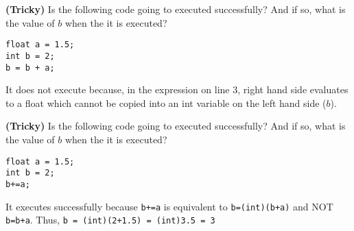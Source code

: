 \begin{questions}
\question \textbf{(Tricky)} Is the following code going to executed successfully? And if so, what is the value of $b$ when the it is executed?

\begin{lstlisting}
float a = 1.5;
int b = 2;
b = b + a;
\end{lstlisting}

\begin{solution}
It does not execute because, in the expression on line 3, right hand side evaluates to a float which cannot be copied into an int variable on the left hand side ($b$).
\end{solution}


\question \textbf{(Tricky)} Is the following code going to executed successfully? And if so, what is the value of $b$ when the it is executed?

\begin{lstlisting}
float a = 1.5;
int b = 2;
b+=a;
\end{lstlisting}

\begin{solution}
It executes successfully because \texttt{b+=a} is equivalent to \texttt{b=(int)(b+a)} and NOT \texttt{b=b+a}. Thus, \texttt{b = (int)(2+1.5) = (int)3.5 = 3}
\end{solution}

\end{questions}